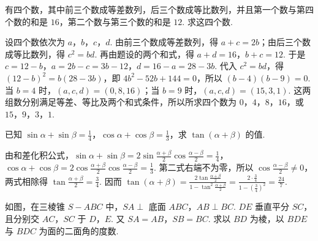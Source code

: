 \begin{problem}
有四个数，其中前三个数成等差数列，后三个数成等比数列，并且第一个数与第四个数的和是 \(16\)，第二个数与第三个数的和是 \(12\). 求这四个数.
\end{problem}

\begin{solution}
设四个数依次为 \(a\)，\(b\)，\(c\)，\(d\). 由前三个数成等差数列，得 \(a+c=2b\)；由后三个数成等比数列，得 \(c^2=bd\). 再由题设的两个和式，得 \(a+d=16\)，\(b+c=12\). 于是 \(c=12-b\)，\(a=2b-c=3b-12\)，\(d=16-a=28-3b\). 代入 \(c^2=bd\)，得 \((12-b)^2=b(28-3b)\)，即 \(4b^2-52b+144=0\)，所以 \((b-4)(b-9)=0\). 当 \(b=4\) 时，\((a,c,d)=(0,8,16)\)；当 \(b=9\) 时，\((a,c,d)=(15,3,1)\). 这两组数分别满足等差、等比及两个和式条件，所以所求四个数为 \(0\)，\(4\)，\(8\)，\(16\)，或 \(15\)，\(9\)，\(3\)，\(1\).
\end{solution}

\begin{problem}
已知 \(\sin \alpha+\sin \beta=\frac{1}{4}\)，\(\cos \alpha+\cos \beta=\frac{1}{3}\)，求 \(\tan(\alpha+\beta)\) 的值.
\end{problem}

\begin{solution}
由和差化积公式，\(\sin\alpha+\sin\beta=2\sin\frac{\alpha+\beta}{2}\cos\frac{\alpha-\beta}{2}=\frac{1}{4}\)，\(\cos\alpha+\cos\beta=2\cos\frac{\alpha+\beta}{2}\cos\frac{\alpha-\beta}{2}=\frac{1}{3}\). 第二式右端不为零，所以 \(\cos\frac{\alpha-\beta}{2}\neq0\)，两式相除得 \(\tan\frac{\alpha+\beta}{2}=\frac{3}{4}\). 因而 \(\tan(\alpha+\beta)=\frac{2\tan\frac{\alpha+\beta}{2}}{1-\tan^2\frac{\alpha+\beta}{2}}=\frac{2\cdot\frac{3}{4}}{1-\left(\frac{3}{4}\right)^2}=\frac{24}{7}\).
\end{solution}

\begin{problem}
如图，在三棱锥 \(S-ABC\) 中，\(SA\perp\) 底面 \(ABC\)，\(AB\perp BC\). \(DE\) 垂直平分 \(SC\)，且分别交 \(AC\)，\(SC\) 于 \(D\)，\(E\). 又 \(SA=AB\)，\(SB=BC\). 求以 \(BD\) 为棱，以 \(BDE\) 与 \(BDC\) 为面的二面角的度数.

\end{problem}


